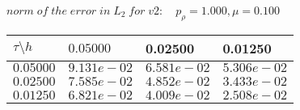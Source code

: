 
 $norm\;of\;the\;error\;in\;L_2\;for\;v2: \quad p_{\rho}=1.000, \mu = 0.100 $ \\ 
\begin{tabular}{|p{0.6in}|p{1.2in}|p{1.2in}|p{1.2in}|} \hline
$\tau\setminus h$ & $0.05000 $ & 0.02500 & 0.01250 \\ \hline
$0.05000$ & $9.131e-02$ &$6.581e-02$ &$5.306e-02$  \\ \hline
$0.02500$ & $7.585e-02$ &$4.852e-02$ &$3.433e-02$  \\ \hline
$0.01250$ & $6.821e-02$ &$4.009e-02$ &$2.508e-02$  \\ \hline
\end{tabular}\\[20pt]
